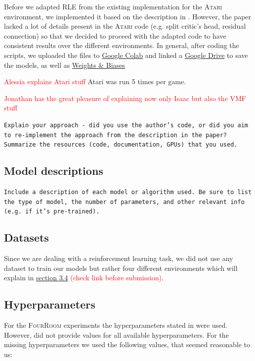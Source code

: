 \documentclass[10pt]{article} %
\begin{document}
\noindent Before we adapted RLE from the existing implementation for the \textsc{Atari} environment, we implemented it based on the description in \cite{rle-paper}. However, the paper lacked a lot of details present in the \textsc{Atari} code (e.g. split critic's head, residual connection) so that we decided to proceed with the adapted code to have consistent results over the different environments. In general, after coding the scripts, we uploaded the files to \href{https://colab.research.google.com/}{Google Colab} and linked a \href{https://drive.google.com}{Google Drive} to save the models, as well as \href{https://wandb.ai}{Weights \& Biases}

\textcolor{red}{Alessia explains Atari stuff} Atari was run 5 times per game.

\textcolor{red}{Jonathan has the great pleasure of explaining now only Isaac but also the VMF stuff}

\texttt{Explain your approach - did you use the author's code, or did you aim to re-implement the approach from the description in the paper? Summarize the resources (code, documentation, GPUs) that you used.}

\subsection{Model descriptions}
\texttt{Include a description of each model or algorithm used. Be sure to list the type of model, the number of parameters, and other relevant info (e.g. if it's pre-trained).}

\subsection{Datasets}

\noindent Since we are dealing with a reinforcement learning task, we did not use any dataset to train our models but rather four different environments which will explain in \hyperlink{experimental-setup}{section 3.4} \textcolor{red}{(check link before submission)}.

\subsection{Hyperparameters}
For the \textsc{FourRoom} experiments the hyperparameters stated in \cite{rle-paper} were used. However, \cite{rle-paper} did not provide values for all available hyperparameters. For the missing hyperparameters we used the following values, that seemed reasonable to us:
\end{document}
